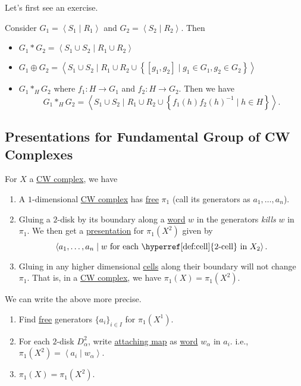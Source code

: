 Let's first see an exercise.
\begin{exercise}
	Consider \(G_1 = \left< S_1 \mid R_1 \right> \) and \(G_2 = \left< S_2 \mid R_2 \right> \). Then
	\begin{itemize}
		\item \(G_1\ast G_2 = \left< S_{1}\cup S_2  \mid R_1 \cup R_2 \right> \)
		\item \(G_1\oplus G_2 = \left< S_1 \cup S_2  \mid R_1 \cup R_2\cup \left\{[g_1, g_2] \mid g_1\in G_1, g_2\in G_2\right\} \right> \)
		\item \(G_1 \ast_H G_2 \) where \(f_1\colon H\to G_1\) and \(f_2\colon H\to G_2\). Then we have
		      \[
			      G_1\ast_H G_2 = \left< S_1 \cup S_2  \mid R_1 \cup  R_2\cup \left\{f_1(h)f_2(h)^{-1}  \mid h\in H\right\} \right>.
		      \]
	\end{itemize}
\end{exercise}

\subsection{Presentations for Fundamental Group of CW Complexes}
For \(X\) a \hyperref[def:CW-Complex]{CW complex}, we have
\begin{enumerate}[(1)]
	\item A \(1\)-dimensional \hyperref[def:CW-Complex]{CW complex} has \hyperref[def:free-group]{free} \(\pi _1\) (call its generators as \(a_1, \dots , a_n \)).
	\item Gluing a \(2\)-disk by its boundary along a \hyperref[def:word]{word} \(w\) in the generators \emph{kills} \(w\) in \(\pi _1\). We then get a
	      \hyperref[def:group-presentation]{presentation} for \(\pi _1(X^2)\) given by
	      \[
		      \left< a_1, \dots , a_n \mid w \text{ for each \hyperref[def:cell]{\(2\)-cell} in \(X_2\)}\right>.
	      \]
	\item Gluing in any higher dimensional \hyperref[def:cell]{cells} along their boundary will not change \(\pi _1\). That is, in a \hyperref[def:CW-Complex]{CW complex},
	      we have \(\pi _1(X) = \pi _1(X^2)\).
\end{enumerate}

\begin{remark}
	We can write the above more precise.
	\begin{enumerate}[(1)]
		\item Find \hyperref[def:free-group]{free} generators \(\{a _i\}_{i\in I}\) for \(\pi _1(X^1)\).
		\item For each \(2\)-disk \(D^2_\alpha \), write \hyperref[def:attaching-map]{attaching map} as \hyperref[def:word]{word} \(w_\alpha \) in \(a_{i}\). i.e.,
		      \(\pi _1(X^2) = \left< a_{i} \mid w_\alpha  \right>\).
		\item \(\pi_1(X) = \pi _1(X^2)\).
	\end{enumerate}
\end{remark}

